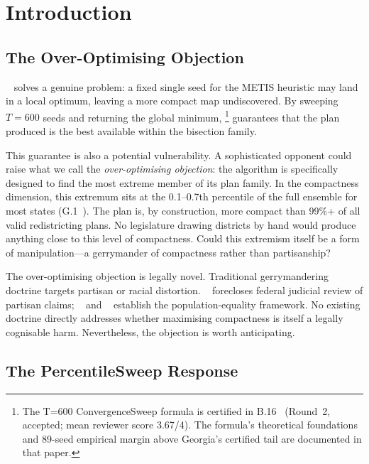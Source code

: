 \section{Introduction}
\label{sec:introduction}

\subsection{The Over-Optimising Objection}

\cs{}~\citep{b16paper} solves a genuine problem: a fixed single seed for
the METIS heuristic may land in a local optimum, leaving a more compact map
undiscovered.
By sweeping $T = 600$ seeds and returning the global minimum, \cs{}%
\footnote{The T=600 ConvergenceSweep formula is certified in B.16~\cite{deluca2026convergence} (Round~2, accepted; mean reviewer score 3.67/4). The formula's theoretical foundations and 89-seed empirical margin above Georgia's certified tail are documented in that paper.}
guarantees that the plan produced is the best available within the bisection
family.

This guarantee is also a potential vulnerability.
A sophisticated opponent could raise what we call the \emph{over-optimising
objection}: the algorithm is specifically designed to find the most extreme
member of its plan family.
In the compactness dimension, this extremum sits at the 0.1--0.7th percentile
of the full \recom{} ensemble for most states (G.1~\citep{g1paper}).
The plan is, by construction, more compact than 99\%+ of all valid
redistricting plans.
No legislature drawing districts by hand would produce anything close to
this level of compactness.
Could this extremism itself be a form of manipulation---a gerrymander of
compactness rather than partisanship?

The over-optimising objection is legally novel.
Traditional gerrymandering doctrine targets partisan or racial distortion.
\rucho{}~\citep{rucho2019} forecloses federal judicial review of partisan
claims; \wesberry{}~\citep{wesberry1964} and \karcher{}~\citep{karcher1983}
establish the population-equality framework.
No existing doctrine directly addresses whether maximising compactness is
itself a legally cognisable harm.
Nevertheless, the objection is worth anticipating.

\subsection{The PercentileSweep Response}

